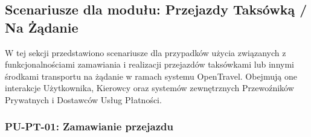 \documentclass[a4paper,12pt]{article}
\begin{document}
\subsection{Scenariusze dla modułu: Przejazdy Taksówką / Na Żądanie}
W tej sekcji przedstawiono scenariusze dla przypadków użycia związanych z funkcjonalnościami zamawiania i realizacji przejazdów taksówkami lub innymi środkami transportu na żądanie w ramach systemu OpenTravel. Obejmują one interakcje Użytkownika, Kierowcy oraz systemów zewnętrznych Przewoźników Prywatnych i Dostawców Usług Płatności.

\subsubsection{PU-PT-01: Zamawianie przejazdu}

\begingroup %
\small %
\renewcommand{\arraystretch}{1.2} %

\newlength{\pierwszakolumnaszerokoscPUTPTZamow}
\setlength{\pierwszakolumnaszerokoscPUTPTZamow}{4.0cm}

\newlength{\drugakolumnaszerokoscPUTPTZamow}
\setlength{\drugakolumnaszerokoscPUTPTZamow}{\dimexpr\textwidth-\pierwszakolumnaszerokoscPUTPTZamow-2\tabcolsep-3\arrayrulewidth\relax}
\end{document}
